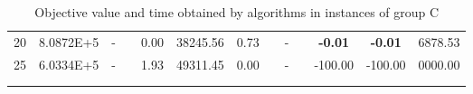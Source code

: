 {\begin{longtable}{@{}llccccccccccc@{}}
\multicolumn{1}{l|}{20} & \multicolumn{1}{l|}{8.0872E+5}  & -    & \multicolumn{1}{c|}{}    & 0.00 & \multicolumn{1}{c|}{38245.56} & 0.73 & \multicolumn{1}{c|}{}    & -    & \multicolumn{1}{c|}{}    & \textbf{-0.01}  & \textbf{-0.01}  & 6878.53 \\
\multicolumn{1}{l|}{25} & \multicolumn{1}{l|}{6.0334E+5}  & -    & \multicolumn{1}{c|}{}    & 1.93 & \multicolumn{1}{c|}{49311.45} & 0.00 & \multicolumn{1}{c|}{}    & -    & \multicolumn{1}{c|}{}    & -100.00         & -100.00         & 0000.00 \\ \hline
\caption{Objective value and time obtained by algorithms in instances of group C}\\
\label{results-all-C}\\
\end{longtable}}